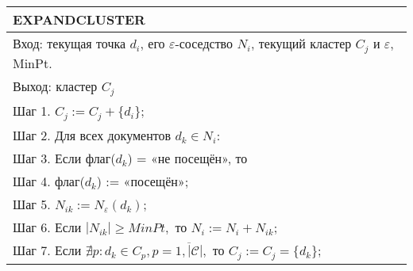 \begin{table}[h!]
	\begin{threeparttable}
		\captionsetup{justification=raggedleft,singlelinecheck=off}
		\begin{tabular}{l}
			\hline
			EXPANDCLUSTER \\
			\hline
			Вход: текущая точка \(d_i\), его \(\varepsilon\)-соседство \(N_i\), текущий кластер \(C_j\) и \(\varepsilon\), MinPt.\\
			Выход: кластер \(C_j\)\\
			Шаг 1. \(C_j := C_j + \{d_i\}\); \\
			Шаг 2. Для всех документов \(d_k \in N_i\): \\
			Шаг 3. \quad Если флаг(\(d_k\)) = «не посещён», то \\
			Шаг 4. \quad\quad флаг(\(d_k\)) := «посещён»; \\
			Шаг 5. \quad\quad \(N_{ik} := N_{\varepsilon}(d_k)\); \\
			Шаг 6. \quad\quad Если \(|N_{ik}| \ge MinPt, \text{ то } N_i := N_i + N_{ik}\); \\
			Шаг 7. \quad Если \(\nexists p: d_k \in C_p, p = \overline{1, |\mathcal{C}|}, \text{ то } C_j := C_j = \{d_k\}\); \\
			\hline
		\end{tabular}
	\end{threeparttable}
\end{table}
